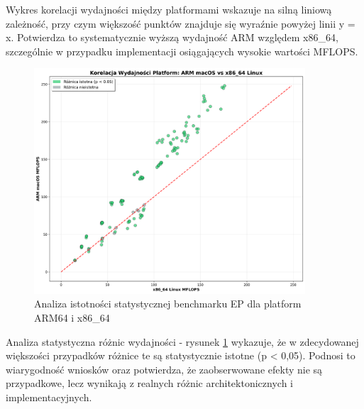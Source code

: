 Wykres korelacji wydajności między platformami wskazuje na silną liniową zależność, przy czym większość punktów znajduje się wyraźnie powyżej linii y = x. Potwierdza to systematycznie wyższą wydajność ARM względem x86\_64, szczególnie w przypadku implementacji osiągających wysokie wartości MFLOPS.

\begin{figure}[H]
    \centering
    \includegraphics[width=0.9\textwidth]{analiza/images/parallel/ep/compare/ep_analiza_istotnosci_statystycznej.png}
    \caption{Analiza istotności statystycznej benchmarku EP dla platform ARM64 i x86\_64}
    \label{ep_analiza_istotnosci_statystycznej}
\end{figure}
Analiza statystyczna różnic wydajności - rysunek \ref{ep_analiza_istotnosci_statystycznej} wykazuje, że w zdecydowanej większości przypadków różnice te są statystycznie istotne (p < 0,05). Podnosi to wiarygodność wniosków oraz potwierdza, że zaobserwowane efekty nie są przypadkowe, lecz wynikają z realnych różnic architektonicznych i implementacyjnych.